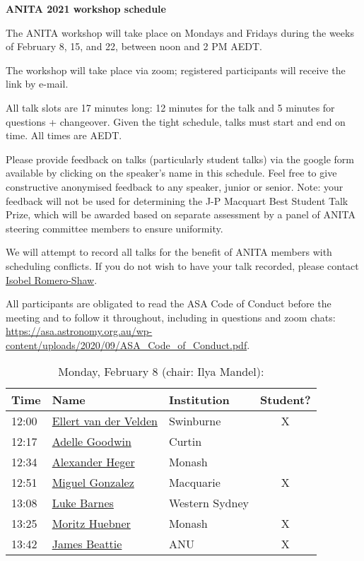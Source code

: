 \documentclass[amsmath,onecolumn]{revtex4-1}
\begin{document}
\begin{center}
{\bf ANITA 2021 workshop schedule}\\
\end{center}
\vspace{0.2in}

The ANITA workshop will take place on Mondays and Fridays during the weeks of February 8, 15, and 22, between noon and 2 PM AEDT.

The workshop will take place via zoom; registered participants will receive the link by e-mail.  

All talk slots are 17 minutes long: 12 minutes for the talk and 5 minutes for questions + changeover.  Given the tight schedule, talks must start and end on time.  All times are AEDT.

Please provide feedback on talks (particularly student talks) via the google form available by clicking on the speaker's name in this schedule.  Feel free to give constructive anonymised feedback to any speaker, junior or senior.  Note: your feedback will not be used for determining the J-P Macquart Best Student Talk Prize, which will be awarded based on separate assessment by a panel of ANITA steering committee members to ensure uniformity.

We will attempt to record all talks for the benefit of ANITA members with scheduling conflicts.  If you do not wish to have your talk recorded, please contact \href{mailto:isobel.romero-shaw@monash.edu}{Isobel Romero-Shaw}.

All participants are obligated to read the ASA Code of Conduct before the meeting and to follow it throughout, including in questions and zoom chats:
\url{https://asa.astronomy.org.au/wp-content/uploads/2020/09/ASA_Code_of_Conduct.pdf}.

\FloatBarrier

\begin{table}[!htbp]
	\centering
	\caption{Monday, February 8 (chair: Ilya Mandel):}
\begin{tabular}{| l | l | l | c |}
	\hline
	Time & Name  & Institution & Student? \\ 		
	\hline
	12:00 & \href{https://forms.gle/ZM8HoYqw1VRShzLNA}{Ellert van der Velden} & Swinburne & X \\
	12:17 &  \href{https://forms.gle/bdRTLLNorm3c2uaN7}{Adelle Goodwin} & Curtin & \\
	12:34 &  \href{https://forms.gle/2j1D6zZwaghz1tc26}{Alexander Heger} & Monash & \\
	12:51 &  \href{https://forms.gle/ekxcKvycqdv4SmtL8}{Miguel Gonzalez} & Macquarie & X\\
	13:08 &  \href{https://forms.gle/iz2mB14cSvaC8N9QA}{Luke Barnes} & Western Sydney & \\
	13:25 &  \href{https://forms.gle/2gdWyrt3Ngb29ewi6}{Moritz Huebner} & Monash & X \\
	13:42 & \href{https://forms.gle/x4VusjZ2K8iYSsV56}{James Beattie} & ANU  & X \\
	\hline
\end{tabular}
\end{table}
\end{document}
